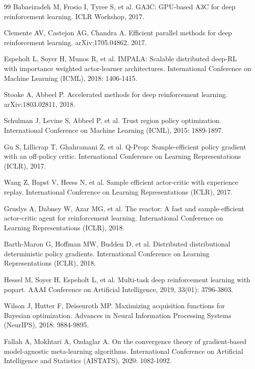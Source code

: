 \documentclass[12pt,a4paper]{ctexart}
\begin{document}
\begin{thebibliography}{99}
 Babaeizadeh M, Frosio I, Tyree S, et al. GA3C: GPU-based A3C for deep reinforcement learning. ICLR Workshop, 2017.

 Clemente AV, Castejon AG, Chandra A. Efficient parallel methods for deep reinforcement learning. arXiv:1705.04862, 2017.

 Espeholt L, Soyer H, Munos R, et al. IMPALA: Scalable distributed deep-RL with importance weighted actor-learner architectures. International Conference on Machine Learning (ICML), 2018: 1406-1415.

 Stooke A, Abbeel P. Accelerated methods for deep reinforcement learning. arXiv:1803.02811, 2018.

 Schulman J, Levine S, Abbeel P, et al. Trust region policy optimization. International Conference on Machine Learning (ICML), 2015: 1889-1897.

 Gu S, Lillicrap T, Ghahramani Z, et al. Q-Prop: Sample-efficient policy gradient with an off-policy critic. International Conference on Learning Representations (ICLR), 2017.

 Wang Z, Bapst V, Heess N, et al. Sample efficient actor-critic with experience replay. International Conference on Learning Representations (ICLR), 2017.

 Gruslys A, Dabney W, Azar MG, et al. The reactor: A fast and sample-efficient actor-critic agent for reinforcement learning. International Conference on Learning Representations (ICLR), 2018.

 Barth-Maron G, Hoffman MW, Budden D, et al. Distributed distributional deterministic policy gradients. International Conference on Learning Representations (ICLR), 2018.

 Hessel M, Soyer H, Espeholt L, et al. Multi-task deep reinforcement learning with popart. AAAI Conference on Artificial Intelligence, 2019, 33(01): 3796-3803.

 Wilson J, Hutter F, Deisenroth MP. Maximizing acquisition functions for Bayesian optimization. Advances in Neural Information Processing Systems (NeurIPS), 2018: 9884-9895.

 Fallah A, Mokhtari A, Ozdaglar A. On the convergence theory of gradient-based model-agnostic meta-learning algorithms. International Conference on Artificial Intelligence and Statistics (AISTATS), 2020: 1082-1092.


\end{thebibliography}
\end{document}
